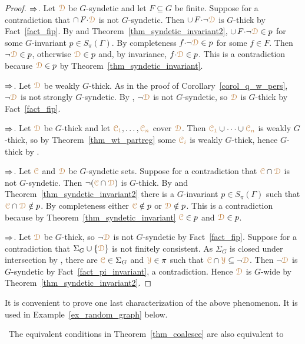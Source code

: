 \begin{proof}
  $\Rightarrow$.
  Let ${\color{brown}\EuScript D}$ be $G$-syndetic and let $F\subseteq G$ be finite.
  Suppose for a contradiction that $\cap\,F{\cdot}{\color{brown}\EuScript D}$ is not $G$-syndetic.
  Then $\cup\,F{\cdot}\neg{\color{brown}\EuScript D}$ is $G$-thick by Fact~\ref{fact_fip}.
  By  and Theorem~\ref{thm_syndetic_invariant2}, $\cup\,F{\cdot}\neg{\color{brown}\EuScript D}\in p$ for some $G$-invariant $p\in S_\pi(\Gamma)$.
  By completeness $f{\cdot}\neg{\color{brown}\EuScript D}\in p$ for some $f\in F$.
  Then $\neg{\color{brown}\EuScript D}\in p$, otherwise ${\color{brown}\EuScript D}\in p$ and, by invariance, $f{\cdot}{\color{brown}\EuScript D}\in p$.
  This is a contradiction because ${\color{brown}\EuScript D}\in p$ by Theorem~\ref{thm_syndetic_invariant}.

  $\Rightarrow$.
  Let ${\color{brown}\EuScript D}$ be weakly $G$-thick.
  As in the proof of Corollary~\ref{corol_q_w_pers}, $\neg{\color{brown}\EuScript D}$ is not strongly $G$-syndetic.
  By , $\neg{\color{brown}\EuScript D}$ is not $G$-syndetic, so ${\color{brown}\EuScript D}$ is $G$-thick by Fact~\ref{fact_fip}.

  $\Rightarrow$.
  Let ${\color{brown}\EuScript D}$ be $G$-thick and let ${\color{brown}\EuScript C_1},\dots,{\color{brown}\EuScript C_n}$ cover ${\color{brown}\EuScript D}$.
  Then ${\color{brown}\EuScript C_1}\cup\dots\cup{\color{brown}\EuScript C_n}$ is weakly $G$-thick, so by Theorem~\ref{thm_wt_partreg} some ${\color{brown}\EuScript C_i}$ is weakly $G$-thick, hence $G$-thick by .

  $\Rightarrow$.
  Let ${\color{brown}\EuScript C}$ and ${\color{brown}\EuScript D}$ be $G$-syndetic sets.
  Suppose for a contradiction that ${\color{brown}\EuScript C}\cap{\color{brown}\EuScript D}$ is not $G$-syndetic.
  Then $\neg({\color{brown}\EuScript C}\cap{\color{brown}\EuScript D})$ is $G$-thick.
  By  and Theorem~\ref{thm_syndetic_invariant2} there is a $G$-invariant $p\in S_\pi(\Gamma)$ such that ${\color{brown}\EuScript C}\cap{\color{brown}\EuScript D}\notin p$.
  By completeness either ${\color{brown}\EuScript C}\notin p$ or ${\color{brown}\EuScript D}\notin p$.
  This is a contradiction because by Theorem~\ref{thm_syndetic_invariant} ${\color{brown}\EuScript C}\in p$ and ${\color{brown}\EuScript D}\in p$.

  $\Rightarrow$.
  Let ${\color{brown}\EuScript D}$ be $G$-thick, so $\neg{\color{brown}\EuScript D}$ is not $G$-syndetic by Fact~\ref{fact_fip}.
  Suppose for a contradiction that $\Sigma_G\cup\{{\color{brown}\EuScript D}\}$ is not finitely consistent.
  As $\Sigma_G$ is closed under intersection by , there are ${\color{brown}\EuScript C}\in\Sigma_G$ and ${\color{brown}\EuScript Y}\in\pi$ such that ${\color{brown}\EuScript C}\cap{\color{brown}\EuScript Y}\subseteq\neg{\color{brown}\EuScript D}$.
  Then $\neg{\color{brown}\EuScript D}$ is $G$-syndetic by Fact~\ref{fact_pi_invariant}, a contradiction.
  Hence ${\color{brown}\EuScript D}$ is $G$-wide by Theorem~\ref{thm_syndetic_invariant2}.
\end{proof}

It is convenient to prove one last characterization of the above phenomenon.
It is used in Example~\ref{ex_random_graph} below.

\begin{proposition}\label{prop_coalese}\ 
  The equivalent conditions in Theorem~\ref{thm_coalesce} are also equivalent to\smallskip

\end{proposition}

